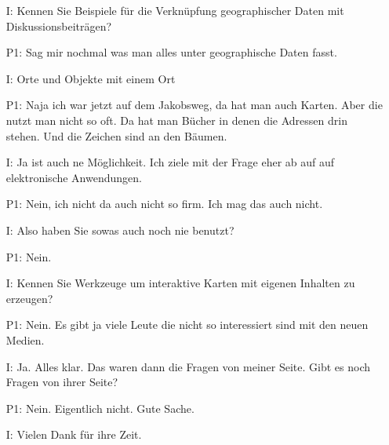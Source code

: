 \begin{itemize}
    \item[I:] Kennen Sie Beispiele f{\"u}r die Verkn{\"u}pfung geographischer Daten mit Diskussionsbeitr{\"a}gen?
	\item[P1:] Sag mir nochmal was man alles unter geographische Daten fasst.
	\item[I:] Orte und Objekte mit einem Ort
	\item[P1:] Naja ich war jetzt auf dem Jakobsweg, da hat man auch Karten. Aber die nutzt man nicht so oft. Da hat man B{\"u}cher in denen die Adressen drin stehen. Und die Zeichen sind an den B{\"a}umen.
	\item[I:] Ja ist auch ne M{\"o}glichkeit. Ich ziele mit der Frage eher ab auf auf elektronische Anwendungen.
	\item[P1:] Nein, ich nicht da auch nicht so firm. Ich mag das auch nicht.
	\item[I:] Also haben Sie sowas auch noch nie benutzt?
	\item[P1:] Nein.
	\item[I:] Kennen Sie Werkzeuge um interaktive Karten mit eigenen Inhalten zu erzeugen?
	\item[P1:] Nein. Es gibt ja viele Leute die nicht so interessiert sind mit den neuen Medien. 
	\item[I:] Ja. Alles klar. Das waren dann die Fragen von meiner Seite. Gibt es noch Fragen von ihrer Seite? 
    \item[P1:] Nein. Eigentlich nicht. Gute Sache.
    \item[I:] Vielen Dank f{\"u}r ihre Zeit.
\end{itemize}